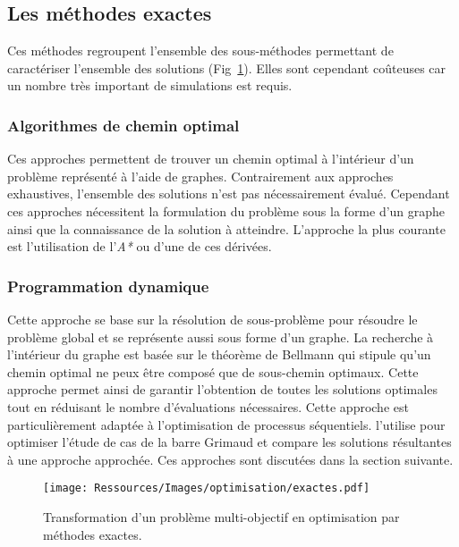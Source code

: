 \subsection{Les méthodes exactes} %
\label{sub:les_methodes_exactes}
Ces méthodes regroupent l’ensemble des sous-méthodes permettant de caractériser
l’ensemble des solutions (Fig~\ref{fig:multi_exactes}). Elles sont cependant
coûteuses car un nombre très important de simulations est requis.


\subsubsection{Algorithmes de chemin optimal} %
\label{ssub:algorithmes_de_chemin_optimal}
Ces approches permettent de trouver un chemin optimal à l’intérieur d’un
problème représenté à l’aide de graphes. Contrairement aux approches
exhaustives, l’ensemble des solutions n’est pas nécessairement évalué. Cependant
ces approches nécessitent la formulation du problème sous la forme d’un graphe
ainsi que la connaissance de la solution à atteindre.
L’approche la plus courante est l’utilisation de l’\textit{A*} ou d’une de ces dérivées.


\subsubsection{Programmation dynamique} %
\label{ssub:programmation_dynamique}
Cette approche se base sur la résolution de sous-problème pour résoudre le
problème global et se représente aussi sous forme d’un graphe. La recherche à
l’intérieur du graphe est basée sur le théorème de Bellmann qui stipule qu’un
chemin optimal ne peux être composé que de sous-chemin optimaux. Cette approche
permet ainsi de garantir l’obtention de toutes les solutions optimales tout en
réduisant le nombre d’évaluations nécessaires. Cette approche est
particulièrement adaptée à l’optimisation de processus séquentiels.
\cite{Rivallain2013} l’utilise pour optimiser l’étude de cas de la barre Grimaud
et compare les solutions résultantes à une approche approchée. Ces approches
sont discutées dans la section suivante.

\begin{figure}
    \begin{center}
        \texttt{[image: Ressources/Images/optimisation/exactes.pdf]}
    \end{center}
    \caption{Transformation d’un problème multi-objectif en optimisation par méthodes
             exactes.
             \label{fig:multi_exactes}}
\end{figure}



